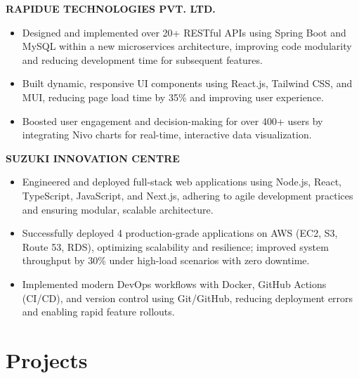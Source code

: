 \documentclass[letterpaper,10pt]{article}
\newcommand{\runsubsection}[1]{
  \color{subheadings}\fontsize{11pt}{13pt}\selectfont\bfseries\uppercase{#1}\normalfont
}
\newcommand{\descript}[1]{
  \color{subheadings}\raggedright\scshape\fontsize{10pt}{12pt}\selectfont{#1\\}\normalfont
}
\newcommand{\location}[1]{
  \color{headings}\raggedright\fontsize{9pt}{11pt}\selectfont{#1\\}\normalfont
}
\newenvironment{tightitemize}{
  \vspace{2pt}\begin{itemize}[leftmargin=12pt]\itemsep1pt \parskip0pt \parsep0pt
}{
  \end{itemize}\vspace{-\topsep}
}
\newcommand{\sectionsep}{\vspace{6pt}}
\begin{document}
\begin{minipage}[t]{0.66\textwidth}
\runsubsection{Rapidue Technologies Pvt. Ltd.}
\descript{| Software Developer}
\location{2024-02 -- 2025-04 | Hyderabad, Telangana}
\begin{tightitemize}

\item Designed and implemented over 20+ RESTful APIs using Spring Boot and MySQL within a new microservices architecture, improving code modularity and reducing development time for subsequent features.

\item Built dynamic, responsive UI components using React.js, Tailwind CSS, and MUI, reducing page load time by 35\% and improving user experience.

\item Boosted user engagement and decision-making for over 400+ users by integrating Nivo charts for real-time, interactive data visualization.

\end{tightitemize}
\sectionsep

\runsubsection{Suzuki Innovation Centre}
\descript{| Software Developer}
\location{2023-07 -- 2024-01 | Hyderabad, Telangana}
\begin{tightitemize}

\item Engineered and deployed full-stack web applications using Node.js, React, TypeScript, JavaScript, and Next.js, adhering to agile development practices and ensuring modular, scalable architecture.

\item Successfully deployed 4 production-grade applications on AWS (EC2, S3, Route 53, RDS), optimizing scalability and resilience; improved system throughput by 30\% under high-load scenarios with zero downtime.

\item Implemented modern DevOps workflows with Docker, GitHub Actions (CI/CD), and version control using Git/GitHub, reducing deployment errors and enabling rapid feature rollouts.

\end{tightitemize}
\sectionsep




\section{Projects}



\end{minipage}
\end{document}
